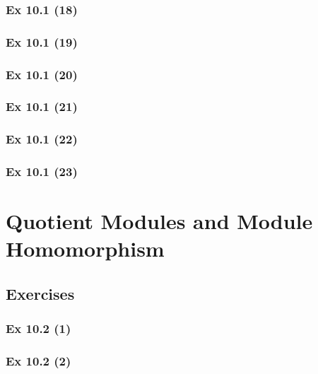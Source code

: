 \subsubsection{Ex 10.1 (18)}\label{sec:Ex_10.1.18}

\subsubsection{Ex 10.1 (19)}\label{sec:Ex_10.1.19}

\subsubsection{Ex 10.1 (20)}\label{sec:Ex_10.1.20}

\newpage		%

\subsubsection{Ex 10.1 (21)}\label{sec:Ex_10.1.21}

\subsubsection{Ex 10.1 (22)}\label{sec:Ex_10.1.22}

\subsubsection{Ex 10.1 (23)}\label{sec:Ex_10.1.23}

\newpage		%

\section{Quotient Modules and Module Homomorphism}\label{sec:10.2}	
\subsection*{Exercises}\label{sec:10.2_Exercises}

\subsubsection{Ex 10.2 (1)}\label{sec:Ex_10.2.1}

\subsubsection{Ex 10.2 (2)}\label{sec:Ex_10.2.2}

